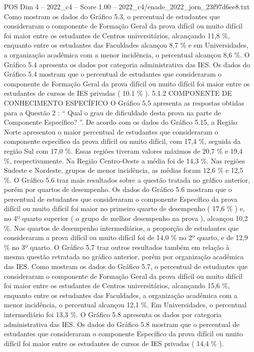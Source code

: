 \begin{textsample}{POS Dim 4 – 2022\_c4 – Score 1.00 – 2022\_c4/enade\_2022\_jorn\_23f97d6ee8.txt}
Como mostram os dados do Gráfico 5.3, o percentual de estudantes que consideraram o componente de Formação Geral da prova difícil ou muito difícil foi maior entre os estudantes de Centros universitários, alcançando 11,8 \%, enquanto entre os estudantes das Faculdades alcançou 8,7 \% e em Universidades, a organização acadêmica com a menor incidência, o percentual alcançou 8,6 \%.
O Gráfico 5.4 apresenta os dados por categoria administrativa das IES.
Os dados do Gráfico 5.4 mostram que o percentual de estudantes que consideraram o componente de Formação Geral da prova difícil ou muito difícil foi maior entre os estudantes de cursos de IES privadas ( 10.1 \% ). 5.1.2 COMPONENTE DE CONHECIMENTO ESPECÍFICO O Gráfico 5.5 apresenta as respostas obtidas para a Questão 2 : “ Qual o grau de dificuldade desta prova na parte de Componente Específico? ”.
De acordo com os dados do Gráfico 5.15, a Região Norte apresentou o maior percentual de estudantes que consideraram o componente específico da prova difícil ou muito difícil, com 17,4 \%, seguida da região Sul com 17,0 \%.
Essas regiões tiveram valores máximos de 20,7 \% e 19,4 \%, respectivamente.
Na Região Centro-Oeste a média foi de 14,3 \%.
Nas regiões Sudeste e Nordeste, grupos de menor incidência, as médias foram 12,6 \% e 12,5 \%.
O Gráfico 5.6 traz mais resultados sobre a questão tratada no gráfico anterior, porém por quartos de desempenho.
Os dados do Gráfico 5.6 mostram que o percentual de estudantes que consideraram o componente Específico da prova difícil ou muito difícil foi maior no primeiro quarto de desempenho ( 17,6 \% ) e, no 4º quarto superior ( o grupo de melhor desempenho na prova ), alcançou 10,2 \%.
Nos quartos de desempenho intermediários, a proporção de estudantes que consideraram a prova difícil ou muito difícil foi de 14,0 \% no 2º quarto, e de 12,9 \% no 3º quarto.
O Gráfico 5.7 traz outros resultados também em relação à mesma questão retratada no gráfico anterior, porém por organização acadêmica das IES.
Como mostram os dados do Gráfico 5.7, o percentual de estudantes que consideraram o componente de Formação Geral da prova difícil ou muito difícil foi maior entre os estudantes de Centros universitários, alcançando 15,6 \%, enquanto entre os estudantes das Faculdades, a organização acadêmica com a menor incidência, o percentual alcançou 12,1 \%.
Em Universidades, o percentual intermediário foi 13,3 \%.
O Gráfico 5.8 apresenta os dados por categoria administrativa das IES.
Os dados do Gráfico 5.8 mostram que o percentual de estudantes que consideraram o componente Específico da prova difícil ou muito difícil foi maior entre os estudantes de cursos de IES privadas ( 14,4 \% ).

\end{textsample}
